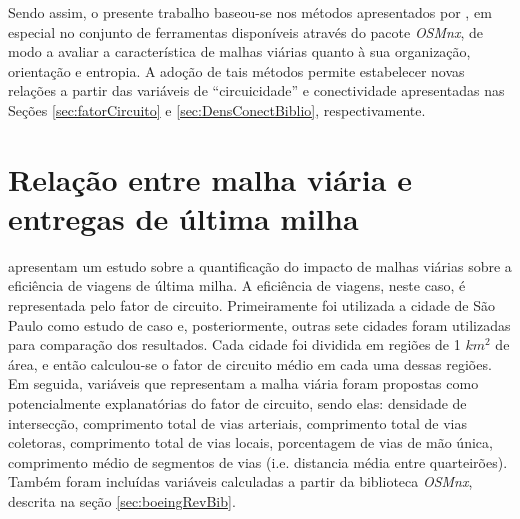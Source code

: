 Sendo assim, o presente trabalho baseou-se nos métodos apresentados por , em especial no conjunto de ferramentas disponíveis através do pacote \textit{OSMnx}, de modo a avaliar a característica de malhas viárias quanto à sua organização, orientação e entropia. 
A adoção de tais métodos permite estabelecer novas relações a partir das variáveis de ``circuicidade'' e conectividade apresentadas nas Seções \ref{sec:fatorCircuito} e \ref{sec:DensConectBiblio}, respectivamente. 

\section{Relação entre malha viária e entregas de última milha} \label{sec:MalhaViariaBiblio}

 apresentam um estudo sobre a quantificação do impacto de malhas viárias sobre a eficiência de viagens de última milha.
A eficiência de viagens, neste caso, é representada pelo fator de circuito. 
Primeiramente foi utilizada a cidade de São Paulo como estudo de caso e, posteriormente, outras sete cidades foram utilizadas para comparação dos resultados. 
Cada cidade foi dividida em regiões de 1 $km^{2}$ de área, e então calculou-se o fator de circuito médio em cada uma dessas regiões.
Em seguida, variáveis que representam a malha viária foram propostas como potencialmente explanatórias do fator de circuito, sendo elas: densidade de intersecção, comprimento total de vias arteriais, comprimento total de vias coletoras, comprimento total de vias locais, porcentagem de vias de mão única, comprimento médio de segmentos de vias (i.e. distancia média entre quarteirões).
Também foram incluídas variáveis calculadas a partir da biblioteca \textit{OSMnx}, descrita na seção \ref{sec:boeingRevBib}. 

